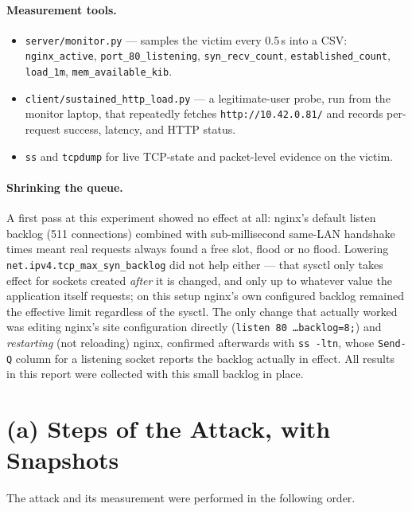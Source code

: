 \documentclass[11pt,a4paper]{article}
\begin{document}
\paragraph{Measurement tools.}
\begin{itemize}[nosep]
  \item \texttt{server/monitor.py} --- samples the victim every 0.5\,s into a CSV:
    \texttt{nginx\_active}, \texttt{port\_80\_listening}, \texttt{syn\_recv\_count},
    \texttt{established\_count}, \texttt{load\_1m}, \texttt{mem\_available\_kib}.
  \item \texttt{client/sustained\_http\_load.py} --- a legitimate-user probe,
    run from the monitor laptop, that repeatedly fetches
    \texttt{http://10.42.0.81/} and records per-request success, latency, and
    HTTP status.
  \item \texttt{ss} and \texttt{tcpdump} for live TCP-state and packet-level
    evidence on the victim.
\end{itemize}

\paragraph{Shrinking the queue.}\label{sec:queue-note}
A first pass at this experiment showed no effect at all: nginx's default
listen backlog (511 connections) combined with sub-millisecond same-LAN
handshake times meant real requests always found a free slot, flood or no
flood. Lowering \texttt{net.ipv4.tcp\_max\_syn\_backlog} did not help either
--- that sysctl only takes effect for sockets created \emph{after} it is
changed, and only up to whatever value the application itself requests; on
this setup nginx's own configured backlog remained the effective limit
regardless of the sysctl. The only change that actually worked was editing
nginx's site configuration directly (\texttt{listen 80 \ldots backlog=8;})
and \emph{restarting} (not reloading) nginx, confirmed afterwards with
\texttt{ss -ltn}, whose \texttt{Send-Q} column for a listening socket reports
the backlog actually in effect. All results in this report were collected
with this small backlog in place.

\section{(a) Steps of the Attack, with Snapshots}
The attack and its measurement were performed in the following order.
\end{document}
